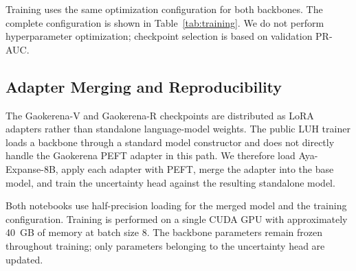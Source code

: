 \documentclass[conference]{IEEEtran}
\begin{document}
Training uses the same optimization configuration for both backbones. The complete configuration is shown in Table~\ref{tab:training}. We do not perform hyperparameter optimization; checkpoint selection is based on validation PR-AUC.

\begin{table}[ht]
\centering
\small
\caption{Training configuration used for both uncertainty heads.}
\label{tab:training}
\end{table}

\subsection{Adapter Merging and Reproducibility}

The Gaokerena-V and Gaokerena-R checkpoints are distributed as LoRA adapters rather than standalone language-model weights. The public LUH trainer loads a backbone through a standard model constructor and does not directly handle the Gaokerena PEFT adapter in this path. We therefore load Aya-Expanse-8B, apply each adapter with PEFT, merge the adapter into the base model, and train the uncertainty head against the resulting standalone model.

Both notebooks use half-precision loading for the merged model and the training configuration. Training is performed on a single CUDA GPU with approximately 40~GB of memory at batch size 8. The backbone parameters remain frozen throughout training; only parameters belonging to the uncertainty head are updated.
\end{document}
